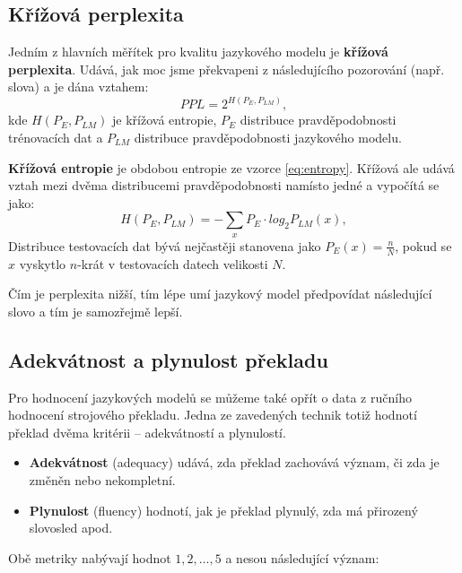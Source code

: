 \documentclass[12pt,a4paper]{report}
\begin{document}
\subsection{Křížová perplexita}
Jedním z hlavních měřítek pro kvalitu jazykového modelu je \textbf{křížová perplexita}. Udává, jak moc jsme překvapeni z následujícího pozorování (např. slova) a je dána vztahem:
\begin{equation}
PPL = 2^{H(P_E, P_{LM})},
\end{equation}
kde $H(P_E, P_{LM})$ je křížová entropie, $P_E$ distribuce pravděpodobnosti trénovacích dat a $P_{LM}$ distribuce pravděpodobnosti jazykového modelu.

\textbf{Křížová entropie} je obdobou entropie ze vzorce \eqref{eq:entropy}. Křížová ale udává vztah mezi dvěma distribucemi pravděpodobnosti namísto jedné a vypočítá se jako:
\begin{equation}
H(P_E, P_{LM}) = -\sum_x {P_E} \cdot log_2 P_{LM}(x),
\end{equation}
Distribuce testovacích dat bývá nejčastěji stanovena jako $P_E(x) = \frac{n}{N}$, pokud se $x$ vyskytlo $n$-krát v testovacích datech velikosti $N$.

Čím je perplexita nižší, tím lépe umí jazykový model předpovídat následující slovo a tím je samozřejmě lepší.

\subsection{Adekvátnost a plynulost překladu}
Pro hodnocení jazykových modelů se můžeme také opřít o data z ručního hodnocení strojového překladu. Jedna ze zavedených technik totiž hodnotí překlad dvěma kritérii  -- adekvátností a plynulostí.

\begin{itemize}
\item{\textbf{Adekvátnost} (adequacy) udává, zda překlad zachovává význam, či zda je změněn nebo nekompletní.}
\item{\textbf{Plynulost} (fluency) hodnotí, jak je překlad plynulý, zda má přirozený slovosled apod.}
\end{itemize}

Obě metriky nabývají hodnot $1, 2, \ldots, 5$ a nesou následující význam:
\end{document}
